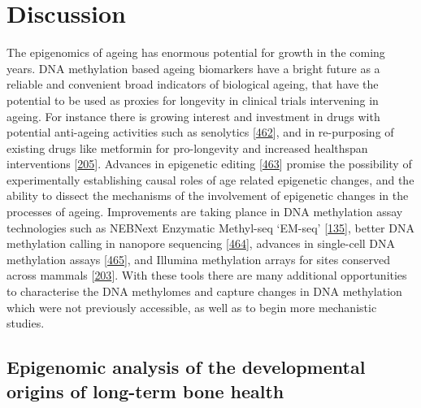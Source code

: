 \documentclass[
]{book}
\begin{document}
\hypertarget{discussion}{%
\chapter{Discussion}\label{discussion}}

The epigenomics of ageing has enormous potential for growth in the coming years.
DNA methylation based ageing biomarkers have a bright future as a reliable and convenient broad indicators of biological ageing, that have the potential to be used as proxies for longevity in clinical trials intervening in ageing.
For instance there is growing interest and investment in drugs with potential anti-ageing activities such as senolytics {[}\protect\hyperlink{ref-VanDeursen2019}{462}{]}, and in re-purposing of existing drugs like metformin for pro-longevity and increased healthspan interventions {[}\protect\hyperlink{ref-TAME2020}{205}{]}.
Advances in epigenetic editing {[}\protect\hyperlink{ref-Gjaltema2020}{463}{]} promise the possibility of experimentally establishing causal roles of age related epigenetic changes, and the ability to dissect the mechanisms of the involvement of epigenetic changes in the processes of ageing.
Improvements are taking plance in DNA methylation assay technologies such as NEBNext Enzymatic Methyl-seq `EM-seq' {[}\protect\hyperlink{ref-Williams2019}{135}{]}, better DNA methylation calling in nanopore sequencing {[}\protect\hyperlink{ref-Ni2019}{464}{]}, advances in single-cell DNA methylation assays {[}\protect\hyperlink{ref-Zhu2018a}{465}{]}, and Illumina methylation arrays for sites conserved across mammals {[}\protect\hyperlink{ref-Horvath2020}{203}{]}. With these tools there are many additional opportunities to characterise the DNA methylomes and capture changes in DNA methylation which were not previously accessible, as well as to begin more mechanistic studies.

\hypertarget{epigenomic-analysis-of-the-developmental-origins-of-long-term-bone-health}{%
\section{Epigenomic analysis of the developmental origins of long-term bone health}\label{epigenomic-analysis-of-the-developmental-origins-of-long-term-bone-health}}
\end{document}
